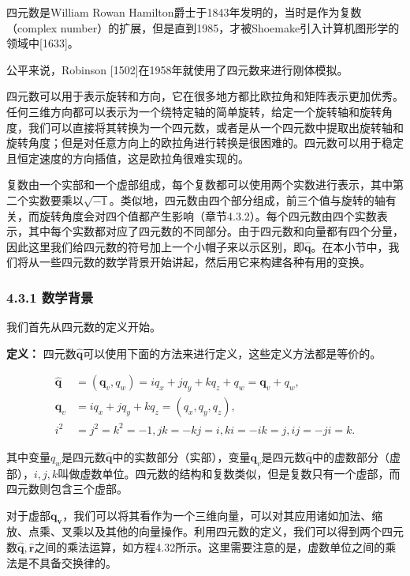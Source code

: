 \documentclass[
  paper=a4,
  ,captions=tableheading
]{scrartcl}
\renewenvironment{quote}{\begin{customblockquote}\list{}{\rightmargin=0em\leftmargin=0em}%
\item\relax\color{blockquote-text}\ignorespaces}{\unskip\unskip\endlist\end{customblockquote}}
\begin{document}
四元数是William Rowan
Hamilton爵士于1843年发明的，当时是作为复数（complex
number）的扩展，但是直到1985，才被Shoemake引入计算机图形学的领域中{[}1633{]}。

\begin{quote}
  公平来说，Robinson {[}1502{]}在1958年就使用了四元数来进行刚体模拟。
\end{quote}

四元数可以用于表示旋转和方向，它在很多地方都比欧拉角和矩阵表示更加优秀。任何三维方向都可以表示为一个绕特定轴的简单旋转，给定一个旋转轴和旋转角度，我们可以直接将其转换为一个四元数，或者是从一个四元数中提取出旋转轴和旋转角度；但是对任意方向上的欧拉角进行转换是很困难的。四元数可以用于稳定且恒定速度的方向插值，这是欧拉角很难实现的。

复数由一个实部和一个虚部组成，每个复数都可以使用两个实数进行表示，其中第二个实数要乘以\(\sqrt{-1}\)。类似地，四元数由四个部分组成，前三个值与旋转的轴有关，而旋转角度会对四个值都产生影响（章节4.3.2）。每个四元数由四个实数表示，其中每个实数都对应了四元数的不同部分。由于四元数和向量都有四个分量，因此这里我们给四元数的符号加上一个小帽子来以示区别，即\(\mathbf{\hat{q}}\)。在本小节中，我们将从一些四元数的数学背景开始讲起，然后用它来构建各种有用的变换。

\subsubsection{4.3.1 数学背景}\label{ux6570ux5b66ux80ccux666f}

我们首先从四元数的定义开始。

\textbf{定义：}
四元数\(\mathbf{\hat{q}}\)可以使用下面的方法来进行定义，这些定义方法都是等价的。

\[
  \begin{aligned}
    \hat{\mathbf{q}} & =\left(\mathbf{q}_{v}, q_{w}\right)=i q_{x}+j q_{y}+k q_{z}+q_{w}=\mathbf{q}_{v}+q_{w},
    \\ \mathbf{q}_{v} &=i q_{x}+j q_{y}+k q_{z}=\left(q_{x}, q_{y}, q_{z}\right),
    \\ i^{2} &=j^{2}=k^{2}=-1, j k=-k j=i, k i=-i k=j, i j=-j i=k.
  \end{aligned}
  \tag{4.31}
\]

其中变量\(q_w\)是四元数\(\mathbf{\hat{q}}\)中的实数部分（实部），变量\(\mathbf{q}_v\)是四元数\(\mathbf{\hat{q}}\)中的虚数部分（虚部），\(i,j,k\)叫做虚数单位。四元数的结构和复数类似，但是复数只有一个虚部，而四元数则包含三个虚部。

对于虚部\(\mathbf{q_v}\)，我们可以将其看作为一个三维向量，可以对其应用诸如加法、缩放、点乘、叉乘以及其他的向量操作。利用四元数的定义，我们可以得到两个四元数\(\mathbf{\hat{q},\hat{r}}\)之间的乘法运算，如方程4.32所示。这里需要注意的是，虚数单位之间的乘法是不具备交换律的。
\end{document}
